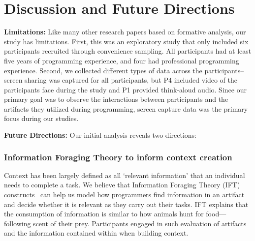 
\section{Discussion and Future Directions}
\textbf{Limitations:} Like many other research papers based on formative analysis, our study has limitations. First, this was an exploratory study that only included six participants recruited through convenience sampling. All participants had at least five years of programming experience, and four had professional programming experience. Second, we collected different types of data across the participants-- screen sharing was captured for all participants, but P4 included video of the participants face during the study and P1 provided think-aloud audio. Since our primary goal was to observe the interactions between participants and the artifacts they utilized during programming, screen capture data was the primary focus during our studies. 



\textbf{Future Directions:} Our initial analysis reveals two directions: 

\vspace{-2pt}
\subsubsection{Information Foraging Theory to inform context creation}
Context has been largely defined as all `relevant information' that an individual needs to complete a task. We believe that Information Foraging Theory (IFT) constructs~\cite{Pirolli:1995,Fleming:2013} can help us model how programmers find information in an artifact and decide whether it is relevant as they carry out their tasks. IFT explains that the consumption of information is similar to how animals hunt for food---following scent of their prey. Participants engaged in such evaluation of artifacts and the information contained within when building context. 

